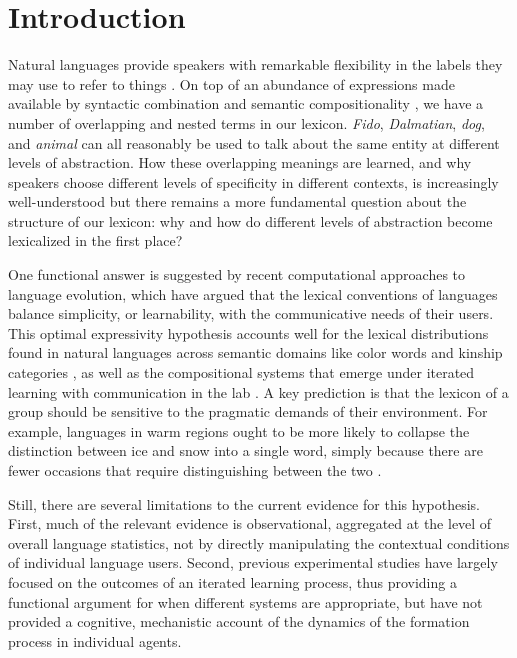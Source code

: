 \documentclass[10pt,letterpaper]{article}
\begin{document}
\section{Introduction}
Natural languages provide speakers with remarkable flexibility in the labels they may use to refer to things \cite{Brown58_HowShallAThingBeCalled}. %
On top of an abundance of expressions made available by syntactic combination and semantic compositionality \cite{Partee95_LexicalSemanticsCompositionality}, we have a number of overlapping and nested terms in our lexicon. \emph{Fido}, \emph{Dalmatian}, \emph{dog}, and \emph{animal} can all reasonably be used to talk about the same entity at different levels of abstraction. How these overlapping meanings are learned, and why speakers choose different levels of specificity in different contexts, is increasingly well-understood %
but there remains a more fundamental question about the structure of our lexicon: why and how do different levels of abstraction become lexicalized in the first place? %

One functional answer is suggested by recent computational approaches to language evolution, which have argued that the lexical conventions of languages balance simplicity, or learnability, with the communicative needs of their users. This optimal expressivity hypothesis accounts well for the lexical distributions found in natural languages across semantic domains like color words and kinship categories \cite{RegierKempKay15_WordMeaningsEfficientCommunication}, as well as the compositional systems that emerge under iterated learning with communication in the lab \cite{WintersKirbySmith14_LanguagesAdapt, KirbyTamarizCornishSmith15_CompressionCommunication}. A key prediction is that the lexicon of a group should be sensitive to the pragmatic demands of their environment. For example, languages in warm regions ought to be more likely to collapse the distinction between ice and snow into a single word, simply because there are fewer occasions that require distinguishing between the two \cite{RegierCarstensenKemp16_WordsForSnow}. 

Still, there are several limitations to the current evidence for this hypothesis. 
First, much of the relevant evidence is observational, aggregated at the level of overall language statistics, not by directly manipulating the contextual conditions of individual language users. 
Second, previous experimental studies have largely focused on the outcomes of an iterated learning process, thus providing a functional argument for when different systems are appropriate, but have not provided a cognitive, mechanistic account of the dynamics of the formation process in individual agents.
\end{document}
